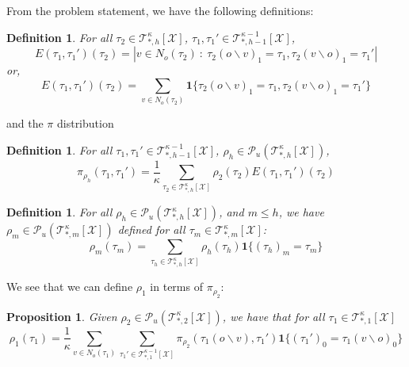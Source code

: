 \documentclass[12pt]{article}
\newtheorem{proposition}[theorem]{Proposition}
\newtheorem{definition}[theorem]{Definition}
\newcommand{\one}[1]{\mathbf{1}\{#1\}}
\newcommand{\tree}[2]{\mathcal{T}_{*, #1}^{#2}[\mathcal{X}]}
\numberwithin{equation}{section}
\begin{document}
From the problem statement, we have the following definitions:
\begin{definition}
    For all $\tau_2\in \mathcal{T}_{*, h}^\kappa[\mathcal{X}]$, $\tau_1, \tau_1'\in \mathcal{T}_{*, h-1}^{\kappa-1}[\mathcal{X}]$,
    \begin{equation*}
        E(\tau_1, \tau_1')(\tau_2) = |v\in N_o(\tau_2)\ :\ \tau_2(o\backslash v)_1 = \tau_1, \tau_2(v\backslash o)_1 = \tau_1'|
    \end{equation*}
    or,
    \begin{equation*}
        E(\tau_1, \tau_1')(\tau_2) = \sum_{v\in N_o(\tau_2)}\mathbf{1}\{\tau_2(o\backslash v)_1 = \tau_1, \tau_2(v\backslash o)_1 = \tau_1'\}
    \end{equation*}
\end{definition}
and the $\pi$ distribution
\begin{definition}
    For all $\tau_1, \tau_1'\in \mathcal{T}_{*, h-1}^{\kappa-1}[\mathcal{X}]$, $\rho_h\in \mathcal{P}_u(\mathcal{T}_{*, h}^\kappa[\mathcal{X}])$,
    \begin{equation*}
        \pi_{\rho_h}(\tau_1, \tau_1') = \frac1\kappa \sum_{\tau_2\in \mathcal{T}_{*, h}^\kappa[\mathcal{X}]} \rho_2(\tau_2) E(\tau_1, \tau_1')(\tau_2)
    \end{equation*}
\end{definition}

\begin{definition}
    For all $\rho_h\in \mathcal{P}_u(\mathcal{T}_{*, h}^\kappa[\mathcal{X}])$, and $m\leq h$, we have
    $\rho_m\in \mathcal{P}_u(\mathcal{T}_{*, m}^\kappa[\mathcal{X}])$ defined for all $\tau_m \in \mathcal{T}_{*, m}^\kappa[\mathcal{X}]$:
    \begin{equation*}
        \rho_m(\tau_m) = \sum_{\tau_h\in \mathcal{T}_{*, h}^\kappa[\mathcal{X}]} \rho_h(\tau_h)\mathbf{1}\{(\tau_h)_m = \tau_m\}
    \end{equation*}
\end{definition}

We see that we can define $\rho_1$ in terms of $\pi_{\rho_2}$:
\begin{proposition}
    Given $\rho_2\in \mathcal{P}_u(\mathcal{T}_{*, 2}^\kappa[\mathcal{X}])$, we have that for all $\tau_1\in \mathcal{T}_{*, 1}^\kappa[\mathcal{X}]$
    \begin{equation*}
        \rho_1(\tau_1) = \frac1\kappa\sum_{v\in N_o(\tau_1)}\sum_{\tau_1'\in\tree{1}{\kappa-1}}\pi_{\rho_2}(\tau_1(o\backslash v), \tau_1')\one{(\tau_1')_0=\tau_1(v\backslash o)_0}
    \end{equation*}
\end{proposition}
\end{document}
